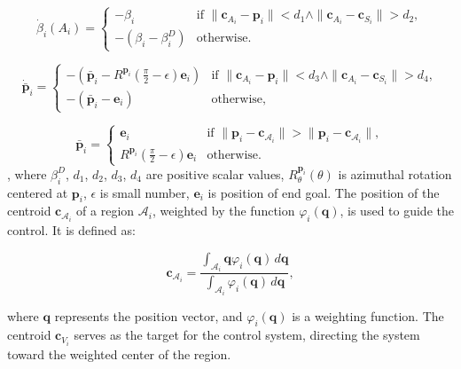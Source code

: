         \begin{equation}
            \dot{\beta}_i(A_i) = 
            \begin{cases}
                -\beta_i & \text{if } \|\mathbf{c}_{A_i} - \mathbf{p}_i\| < d_1 \land \|\mathbf{c}_{A_i} - \mathbf{c}_{S_i}\| > d_2, \\
                -(\beta_i - \beta_i^D) & \text{otherwise.}
            \end{cases}
        \end{equation}
        
        \begin{equation}
            \mathbf{\dot{\bar{p}}}_i = 
            \begin{cases}
                -(\mathbf{\bar{p}}_i - R^{\mathbf{p}_i} (\frac{\pi}{2} - \epsilon) \mathbf{e}_i) & \text{if } \|\mathbf{c}_{A_i} - \mathbf{p}_i\| < d_3 \land \|\mathbf{c}_{A_i} - \mathbf{c}_{S_i}\| > d_4, \\
                -(\mathbf{\bar{p}}_i - \mathbf{e}_i) & \text{otherwise,}
            \end{cases}
        \end{equation}
        
        \[
            \mathbf{\bar{p}}_i = 
            \begin{cases}
            \mathbf{e}_i & \text{if } \|\mathbf{p}_i - \mathbf{c}_{\mathcal{A}_i}\| > \|\mathbf{p}_i - \mathbf{c}_{\mathcal{A}_i}\|, \\
            R^{\mathbf{p}_i} (\frac{\pi}{2} - \epsilon) \mathbf{e}_i & \text{otherwise.}
            \end{cases}
        \]
        , where \(\beta_i^D\), \(d_1\), \(d_2\), \(d_3\), \(d_4\) are positive scalar values, \(R_{\theta}^{\mathbf{p}_i}(\theta)\) is azimuthal rotation centered at \(\mathbf{p}_i\),
        \(\epsilon\) is small number, \(\mathbf{e}_i\) is position of end goal.
        The position of the centroid \( \mathbf{c}_{\mathcal{A}_i} \) of a region \( \mathcal{A}_i \), weighted by the function \( \varphi_i(\mathbf{q}) \), is used to guide the control. 
        It is defined as:

        \begin{equation}
            \mathbf{c}_{\mathcal{A}_i} = \frac{\int_{\mathcal{A}_i} \mathbf{q} \varphi_i(\mathbf{q}) \, d\mathbf{q}}{\int_{\mathcal{A}_i} \varphi_i(\mathbf{q}) \, d\mathbf{q}},
        \end{equation}

        where \( \mathbf{q} \) represents the position vector, and \( \varphi_i(\mathbf{q}) \) is a weighting function. 
        The centroid \( \mathbf{c}_{V_i} \) serves as the target for the control system, directing the system toward the weighted center of the region.
    
